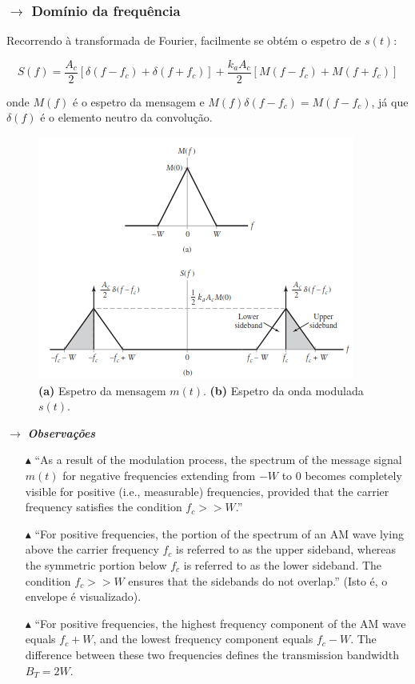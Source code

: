 \newpage
\subsubsection*{$\rightarrow$ Domínio da frequência}
\label{subsubsec:AM-freq-domain}

Recorrendo à transformada de Fourier, facilmente se obtém o espetro de $s(t)$:

$$
    \boxed{S(f) = \frac{A_c}{2}[\delta(f - f_c) + \delta(f + f_c)] + \frac{k_a A_c}{2}\left[M(f - f_c) + M(f + f_c)\right]}
$$

\noindent onde $M(f)$ é o espetro da mensagem e $M(f)\delta(f - f_c) = M(f - f_c)$, já que $\delta(f)$ é o elemento neutro da convolução.

\begin{figure}[H]
    \centering
    \includegraphics[width = 0.8\linewidth]{img/analog/AM/freqDomain.png}
    \caption{\textbf{(a)} Espetro da mensagem $m(t)$. \textbf{(b)} Espetro da onda modulada $s(t)$.}
    \label{fig:freqDomainDSB}
\end{figure}

\noindent $\pmb{\rightarrow}$ \textbf{\textit{Observações}}
\begin{itemize}
    \item[$\blacktriangle$] ``As a result of the modulation process, the spectrum of the message signal $m(t)$ for negative frequencies extending from $-W$ to 0 becomes completely visible for positive (i.e., measurable) frequencies, provided that the carrier frequency satisfies the condition $f_c >> W$.''\cite{Haykin2007}
    \item[$\blacktriangle$] ``For positive frequencies, the portion of the spectrum of an AM wave lying above the carrier frequency $f_c$ is referred to as the upper sideband, whereas the symmetric portion below $f_c$ is referred to as the lower sideband. The condition $f_c >> W$ ensures that the sidebands do not overlap.''\cite{Haykin2007} (Isto é, o envelope é visualizado).
    \item[$\blacktriangle$]``For positive frequencies, the highest frequency component of the AM wave equals $f_c + W$, and the lowest frequency component equals $f_c - W$. The difference between these two frequencies defines the transmission bandwidth $B_T = 2W$.\cite{Haykin2007}
\end{itemize}

